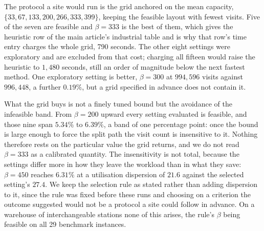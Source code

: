 \documentclass[11pt]{article}
\begin{document}
The protocol a site would run is the grid anchored on the mean capacity,
$\{33,67,133,200,266,333,399\}$, keeping the feasible layout with fewest visits. Five of the seven
are feasible and $\beta=333$ is the best of them, which gives the heuristic row of the main
article's industrial table and is why that row's time entry charges the whole grid, 790 seconds.
The other eight settings were exploratory and are excluded from that cost; charging all fifteen
would raise the heuristic to $1{,}480$ seconds, still an order of magnitude below the next fastest
method. One exploratory setting is better, $\beta=300$ at $994{,}596$ visits against $996{,}448$, a
further $0.19\%$, but a grid specified in advance does not contain it.

What the grid buys is not a finely tuned bound but the avoidance of the infeasible band. From
$\beta=200$ upward every setting evaluated is feasible, and those nine span $5.34\%$ to $6.39\%$,
a band of one percentage point: once the bound is large enough to force the split path the visit
count is insensitive to it. Nothing therefore rests on the particular value the grid returns, and
we do not read $\beta=333$ as a calibrated quantity. The insensitivity is not total, because the
settings differ more in how they leave the workload than in what they save: $\beta=450$ reaches
$6.31\%$ at a utilisation dispersion of $21.6$ against the selected setting's $27.4$. We keep the
selection rule as stated rather than adding dispersion to it, since the rule was fixed before these
runs and choosing on a criterion the outcome suggested would not be a protocol a site could follow
in advance. On a warehouse of interchangeable stations none of this arises, the rule's $\beta$
being feasible on all 29 benchmark instances.
\end{document}
